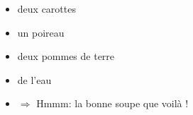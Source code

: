 \documentclass{beamer}
\begin{document}
   \begin{frame}
    \begin{itemize}
       \item deux carottes
       \item un poireau
       \item deux pommes de terre
       \item de l'eau
       \item[] $\Rightarrow$ Hmmm: la bonne soupe que voilà !
    \end{itemize}
   \end{frame}
\end{document}
